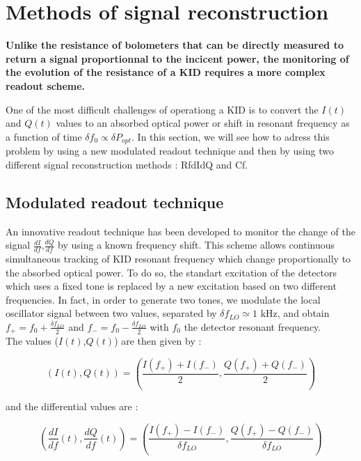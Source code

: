 \section{Methods of signal reconstruction}

{\bf Unlike the resistance of bolometers that can be directly measured to return
  a signal proportionnal to the incicent power, the monitoring of the evolution
  of the resistance of a KID requires a more complex readout scheme.}

One of the most difficult challenges of operationg a KID is to convert the
$I(t)$ and $Q(t)$ values to an absorbed optical power or shift in resonant
frequency as a function of time $\delta f_{0} \propto \delta P_{opt}$. In this
section, we will see how to adress this problem by using a new modulated readout
technique and then by using two different signal reconstruction methods : RfdIdQ
and Cf.

\subsection{Modulated readout technique}
An innovative readout technique has been developed to monitor the change of the signal $\frac{dI}{df}$,$\frac{dQ}{df}$ by using a known frequency shift. This scheme allows continuous simultaneous tracking of KID resonant frequency which change proportionally to the absorbed optical power. To do so, the standart excitation of the detectors which uses a fixed tone is replaced by a new excitation based on two different frequencies. In fact, in order to generate two tones, we modulate the local oscillator signal between two values, separated by $\delta f_{LO} \simeq 1$ kHz, and obtain $f_{+} = f_{0} + \frac{\delta f_{LO}}{2}$ and $f_{-} = f_{0} - \frac{\delta f_{LO}}{2}$ with $f_{0}$ the detector resonant frequency.\\
The values ($I(t)$,$Q(t)$) are then given by :

\begin{equation}
(I(t),Q(t)) = (\frac{I(f_{+}) + I(f_{-})}{2}, \frac{Q(f_{+}) + Q(f_{-})}{2})
\end{equation}

and the differential values are :

\begin{equation}
\label{gradient}
(\frac{dI}{df}(t),\frac{dQ}{df}(t)) = (\frac{I(f_{+}) - I(f_{-})}{\delta f_{LO}}, \frac{Q(f_{+}) - Q(f_{-})}{\delta f_{LO}})
\end{equation}

